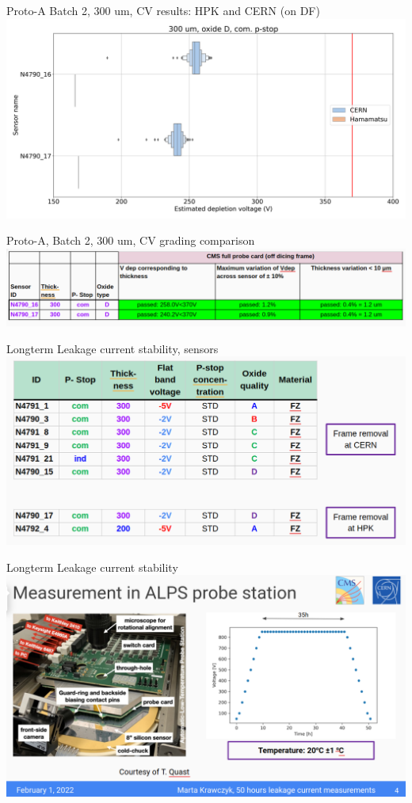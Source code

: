 \documentclass{beamer}
\begin{document}
\begin{frame}{Proto-A Batch 2, 300 um, CV results: HPK and CERN (on DF)}
  \includegraphics[width=.8\textwidth]{plots/CV_ComparisonHPK_300um.png}
\end{frame}

\begin{frame}{Proto-A, Batch 2, 300 um, CV grading comparison}
  \includegraphics[width=.7\textwidth]{plots/CV_grading_300um_2.png}
\end{frame}

\begin{frame}{Longterm Leakage current stability, sensors}
  \includegraphics[width=.9\textwidth]{plots/Longterm_sensors.png}
\end{frame}

\begin{frame}{Longterm Leakage current stability}
  \includegraphics[width=.7\textwidth]{plots/Longterm_process.png}
\end{frame}
\end{document}
